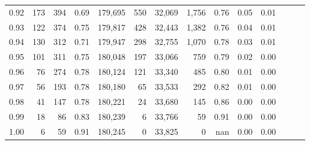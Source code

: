 \begin{tabular}{rrrrrrrrrrrrrr}
0.92 &    173 &  394 &  0.69 &  179,695 &      550 &  32,069 &   1,756 &  0.76 &  0.05 &      0.01 \\
0.93 &    122 &  374 &  0.75 &  179,817 &      428 &  32,443 &   1,382 &  0.76 &  0.04 &      0.01 \\
0.94 &    130 &  312 &  0.71 &  179,947 &      298 &  32,755 &   1,070 &  0.78 &  0.03 &      0.01 \\
0.95 &    101 &  311 &  0.75 &  180,048 &      197 &  33,066 &     759 &  0.79 &  0.02 &      0.00 \\
0.96 &     76 &  274 &  0.78 &  180,124 &      121 &  33,340 &     485 &  0.80 &  0.01 &      0.00 \\
0.97 &     56 &  193 &  0.78 &  180,180 &       65 &  33,533 &     292 &  0.82 &  0.01 &      0.00 \\
0.98 &     41 &  147 &  0.78 &  180,221 &       24 &  33,680 &     145 &  0.86 &  0.00 &      0.00 \\
0.99 &     18 &   86 &  0.83 &  180,239 &        6 &  33,766 &      59 &  0.91 &  0.00 &      0.00 \\
1.00 &      6 &   59 &  0.91 &  180,245 &        0 &  33,825 &       0 &   nan &  0.00 &      0.00 \\
\bottomrule
\end{tabular}
